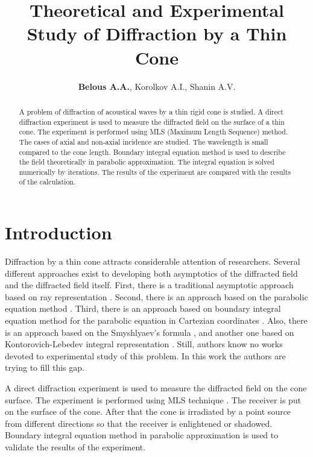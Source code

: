\documentclass{procDDs}
\title{Theoretical and Experimental Study of Diffraction by a Thin Cone}
\author{\textbf{Belous A.A.}, Korolkov A.I., Shanin A.V.}%
{Faculty of Physics, Lomonosov Moscow State University, Russia}                 %
{artem.belous@gmail.com}                                   %
\begin{document}
\maketitle


\begin{abstract}   
   A problem of diffraction of acoustical waves by a thin rigid cone is studied. A direct diffraction experiment is used to measure the diffracted field on the surface of a thin cone. The experiment is performed using MLS (Maximum Length Sequence) method. The cases of axial and non-axial incidence are studied. The wavelength is small compared to the cone length. Boundary integral equation method is used to describe the field theoretically in parabolic approximation. The integral equation is solved numerically by iterations. The results of the experiment are compared with the results of the calculation.
\end{abstract}

\section{Introduction}

   Diffraction by a thin cone  attracts considerable attention of researchers. Several different approaches exist to developing both asymptotics of the diffracted field and the diffracted field itself.  First, there is a traditional asymptotic approach based on ray representation \cite{Popov}. Second, there is an approach based on the parabolic equation method \cite{Andronov}. Third, there is an approach based on boundary integral equation method for the parabolic equation in Cartezian coordinates \cite{Shanin1}. Also, there is an approach based on the Smyshlyaev's formula \cite{Smychlyaev}, and another one based on Kontorovich-Lebedev  integral representation \cite{Lyalinov}. Still, authors know no works devoted to experimental study of this problem. In this work the authors are trying to fill this gap. 
   
   A direct diffraction experiment is used to measure the diffracted field on the cone surface. The experiment is performed using MLS technique \cite{Shanin}. The receiver is put on the surface of the cone. After that the cone is irradiated by a point source from different directions so that the receiver is enlightened or shadowed. Boundary integral equation method in parabolic approximation  \cite{Shanin_parabolic} is used to validate the results of the experiment.
   
\end{document}
